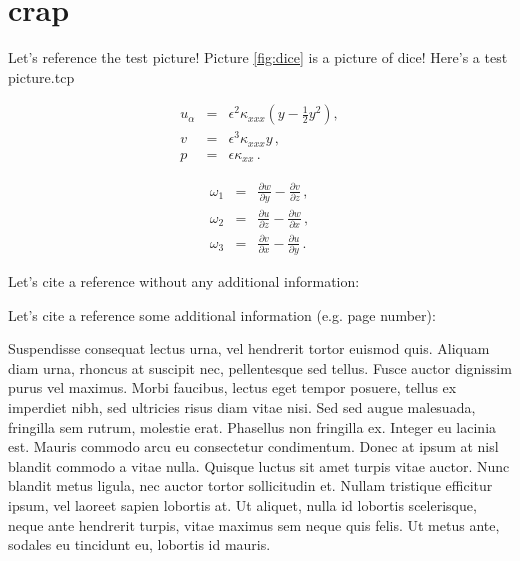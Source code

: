 \documentclass[english]{jamk-report}
\begin{document}
\section{crap}

Let's reference the test picture! Picture \ref{fig:dice} is a picture of
dice! Here's a test picture.\ac{tcp}



\begin{eqnarray}
    u_\alpha & = & \epsilon^2 \kappa_{xxx} 
    \left( y-\frac{1}{2}y^2 \right),
    \label{equ}  \\
    v & = & \epsilon^3 \kappa_{xxx} y\,,
    \label{eqv}  \\
    p & = & \epsilon \kappa_{xx}\,.
    \label{eqp}
\end{eqnarray}

\begin{eqnarray}
    \omega_1 & = &
    \frac{\partial w}{\partial y}-\frac{\partial v}{\partial z}\,,
    \nonumber  \\
    \omega_2 & = & 
    \frac{\partial u}{\partial z}-\frac{\partial w}{\partial x}\,,
    \label{eqcurl}  \\
    \omega_3 & = & 
    \frac{\partial v}{\partial x}-\frac{\partial u}{\partial y}\,.
    \nonumber
\end{eqnarray}





Let's cite a reference without any additional information: 

Let's cite a reference some additional information (e.g. page number):

Suspendisse consequat lectus urna, vel hendrerit tortor euismod quis. Aliquam
diam urna, rhoncus at suscipit nec, pellentesque sed tellus. Fusce auctor
dignissim purus vel maximus. Morbi faucibus, lectus eget tempor posuere, tellus
ex imperdiet nibh, sed ultricies risus diam vitae nisi. Sed sed augue
malesuada, fringilla sem rutrum, molestie erat.  Phasellus non fringilla ex.
Integer eu lacinia est. Mauris commodo arcu eu consectetur condimentum. Donec
at ipsum at nisl blandit commodo a vitae nulla.  Quisque luctus sit amet turpis
vitae auctor. Nunc blandit metus ligula, nec auctor tortor sollicitudin et.
Nullam tristique efficitur ipsum, vel laoreet sapien lobortis at. Ut aliquet,
nulla id lobortis scelerisque, neque ante hendrerit turpis, vitae maximus sem
neque quis felis. Ut metus ante, sodales eu tincidunt eu, lobortis id mauris.
\end{document}
